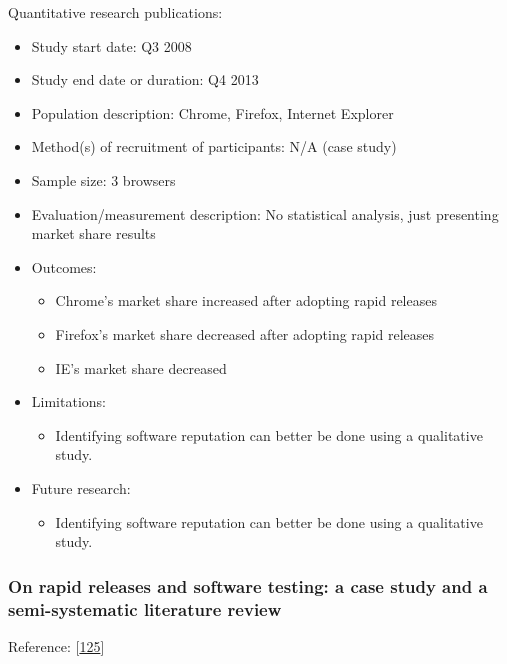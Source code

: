 \documentclass[]{book}
\providecommand{\tightlist}{%
  \setlength{\itemsep}{0pt}\setlength{\parskip}{0pt}}
\begin{document}
Quantitative research publications:

\begin{itemize}
\tightlist
\item
  Study start date: Q3 2008
\item
  Study end date or duration: Q4 2013
\item
  Population description: Chrome, Firefox, Internet Explorer
\item
  Method(s) of recruitment of participants: N/A (case study)
\item
  Sample size: 3 browsers
\item
  Evaluation/measurement description: No statistical analysis, just
  presenting market share results
\item
  Outcomes:

  \begin{itemize}
  \tightlist
  \item
    Chrome's market share increased after adopting rapid releases
  \item
    Firefox's market share decreased after adopting rapid releases
  \item
    IE's market share decreased
  \end{itemize}
\item
  Limitations:

  \begin{itemize}
  \tightlist
  \item
    Identifying software reputation can better be done using a
    qualitative study.
  \end{itemize}
\item
  Future research:

  \begin{itemize}
  \tightlist
  \item
    Identifying software reputation can better be done using a
    qualitative study.
  \end{itemize}
\end{itemize}

\subsubsection{On rapid releases and software testing: a case study and
a semi-systematic literature
review}\label{on-rapid-releases-and-software-testing-a-case-study-and-a-semi-systematic-literature-review}

Reference: {[}\protect\hyperlink{ref-mantyla2015a}{125}{]}
\end{document}
